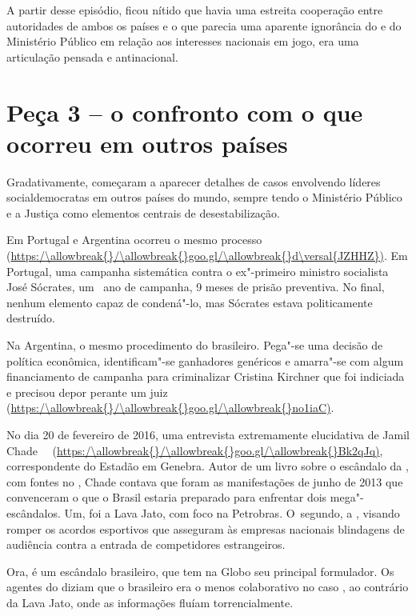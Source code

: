 A partir desse episódio, ficou nítido que havia uma estreita cooperação
entre autoridades de ambos os países e o que parecia uma aparente
ignorância do  e do Ministério Público em relação aos interesses
nacionais em jogo, era uma articulação pensada e antinacional.

\section{Peça 3 -- o confronto com o que ocorreu em outros países}

Gradativamente, começaram a aparecer detalhes de casos envolvendo
líderes socialdemocratas em outros países do mundo, sempre tendo o
Ministério Público e a Justiça como elementos centrais de
desestabilização.

Em Portugal e Argentina ocorreu o mesmo processo
(\url{https:/\allowbreak{}/\allowbreak{}goo.gl/\allowbreak{}d\versal{JZHHZ})}. Em Portugal, uma campanha sistemática
contra o ex"-primeiro ministro socialista José Sócrates, um ~ano de
campanha, 9 meses de prisão preventiva. No final, nenhum elemento capaz
de condená"-lo, mas Sócrates estava politicamente destruído.

Na Argentina, o mesmo procedimento do  brasileiro. Pega"-se uma
decisão de política econômica, identificam"-se ganhadores genéricos e
amarra"-se com algum financiamento de campanha para criminalizar Cristina
Kirchner que foi indiciada e precisou depor perante um juiz
(\url{https:/\allowbreak{}/\allowbreak{}goo.gl/\allowbreak{}no1iaC)}.

No dia 20 de fevereiro de 2016, uma entrevista extremamente elucidativa
de Jamil Chade~~ (\url{https:/\allowbreak{}/\allowbreak{}goo.gl/\allowbreak{}Bk2qJq)}, correspondente do
Estadão em Genebra. Autor de um livro sobre o escândalo da , com
fontes no , Chade contava que foram as manifestações de junho de 2013
que convenceram o  que o Brasil estaria preparado para enfrentar dois
mega"-escândalos. Um, foi a Lava Jato, com foco na Petrobras. O~segundo,
a , visando romper os acordos esportivos que asseguram às empresas
nacionais blindagens de audiência contra a entrada de competidores
estrangeiros.

Ora,  é um escândalo brasileiro, que tem na Globo seu principal
formulador. Os agentes do  diziam que o  brasileiro era o menos
colaborativo no caso , ao contrário da Lava Jato, onde as
informações fluíam torrencialmente.

